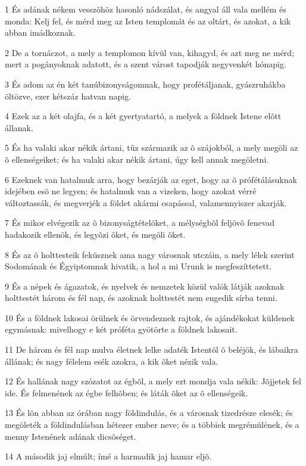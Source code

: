\par 1 És adának nékem vesszõhöz hasonló nádszálat, és angyal áll vala mellém és monda: Kelj fel, és mérd meg az Isten templomát és az oltárt, és azokat, a kik abban imádkoznak.
\par 2 De a tornáczot, a mely a templomon kívül van, kihagyd, és azt meg ne mérd; mert a pogányoknak adatott, és a szent várost tapodják negyvenkét hónapig.
\par 3 És adom az én két tanúbizonyságomnak, hogy profétáljanak, gyászruhákba öltözve, ezer kétszáz hatvan napig.
\par 4 Ezek az a két olajfa, és a két gyertyatartó, a melyek a földnek Istene elõtt állanak.
\par 5 És ha valaki akar nékik ártani, tûz származik az õ szájokból, a mely megöli az õ ellenségeiket; és ha valaki akar nékik ártani, úgy kell annak megöletni.
\par 6 Ezeknek van hatalmuk arra, hogy bezárják az eget, hogy az õ prófétálásuknak idejében esõ ne legyen; és hatalmuk van a vizeken, hogy azokat vérré változtassák,  és megverjék a földet akármi csapással, valamennyiszer akarják.
\par 7 És mikor elvégezik az õ bizonyságtételöket, a mélységbõl feljövõ fenevad hadakozik  ellenök, és legyõzi õket, és megöli õket.
\par 8 És az õ holttesteik feküsznek ama nagy városnak utczáin, a mely lélek szerint Sodomának és Égyiptomnak hivatik, a hol a mi Urunk is megfeszíttetett.
\par 9 És a népek és ágazatok, és nyelvek és nemzetek közül valók látják azoknak holttestét három és fél nap, és azoknak holttestét nem engedik sírba tenni.
\par 10 És a földnek lakosai örülnek és örvendeznek rajtok, és ajándékokat küldenek egymásnak: mivelhogy e két próféta gyötörte a földnek lakosait.
\par 11 De három és fél nap mulva életnek lelke adaték Istentõl õ beléjök, és lábaikra állának; és nagy félelem esék azokra, a kik õket nézik vala.
\par 12 És hallának nagy szózatot az égbõl, a mely ezt mondja vala nékik: Jõjjetek fel ide. És felmenének az égbe felhõben; és láták õket az õ ellenségeik.
\par 13 És lõn abban az órában nagy földindulás, és a városnak tizedrésze elesék; és megöleték a földindulásban hétezer ember neve; és a többiek megrémülének, és a menny Istenének adának dicsõséget.
\par 14 A második jaj elmúlt; ímé a harmadik jaj hamar eljõ.
